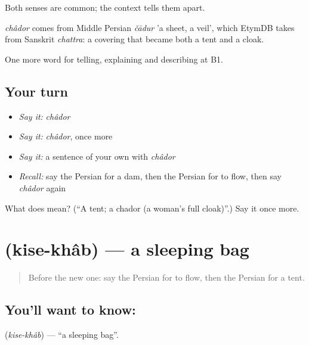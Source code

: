 Both senses are common; the context tells them apart.

\begin{cousinweb}
\emph{châdor} comes from Middle Persian \emph{čādur} 'a sheet, a veil', which EtymDB takes from Sanskrit \emph{chattra}: a covering that became both a tent and a cloak.
\end{cousinweb}

\begin{grammarlens}[title={What you've built}]
One more word for telling, explaining and describing at B1.
\end{grammarlens}

\subsection*{Your turn}
\begin{itemize}
\raggedright
  \item \emph{Say it:} \emph{châdor}
  \item \emph{Say it:} \emph{châdor}, once more
  \item \emph{Say it:} a sentence of your own with \emph{châdor}
  \item \emph{Recall:} say the Persian for a dam, then the Persian for to flow, then say \emph{châdor} again
\end{itemize}

\begin{tcolorbox}[breakable,colback=teal!4,colframe=teal!35!black,title={Before you move on}]
What does  mean? (\textquotedblleft{}A tent; a chador (a woman's full cloak)\textquotedblright{}.) Say it once more.
\end{tcolorbox}
\section[\texorpdfstring{\fa{کیسه} \fa{خواب} (kise-khâb)}{کیسه خواب (kise-khâb)}]{  (kise-khâb) — a sleeping bag}

\label{lesson:FA-C470-kise-khab}



\begin{quote}
Before the new one: say the Persian for to flow, then the Persian for a tent.
\end{quote}

\subsection*{You'll want to know:  }
\textbf{ } (\emph{kise-khâb}) — \textquotedblleft{}a sleeping bag\textquotedblright{}.

